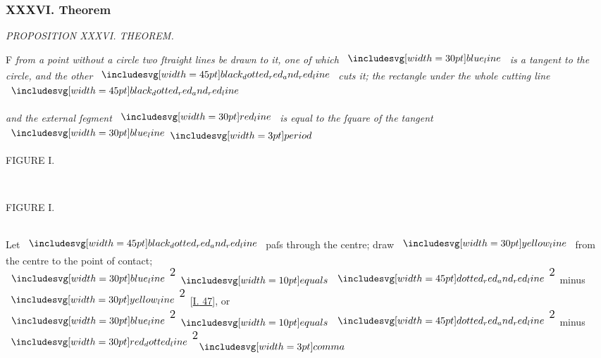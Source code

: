 \documentclass[11pt,preview]{standalone}
\begin{document}
\subsubsection{XXXVI. Theorem}

\hfill

\begin{minipage}[t]{\textwidth}
    \begin{center}
        \textit{PROPOSITION XXXVI. THEOREM.}\label{book3pr36} \\
    \end{center}

    \hfill

    \begin{center}
        \raggedright \lettrine[lines=3, loversize=1, nindent=0pt]{}{}F \textit{from a point without a circle two ſtraight lines be drawn to it, one of which } $\blueline$ \textit{is a tangent to the circle, and the other} $\bimg{black_dotted_red_and_red_line}$ \textit{cuts it; the rectangle under the whole cutting line} $\bimg{black_dotted_red_and_red_line}$
    \end{center}
    \raggedright \textit{and the external ſegment} $\redline$ \textit{is equal to the ſquare of the tangent} $\blueline \bperiod$
\end{minipage}%

\hfill

\begin{minipage}[t]{0.43\textwidth}
    \vspace{0pt}
    \begin{center}
        FIGURE I.
    \end{center}
    \hfill\\
    
\end{minipage}%
\hfill
\begin{minipage}[t]{0.54\textwidth}
    \vspace{0pt}

    \begin{center}
        FIGURE I.\\
        \hfill\\
        \raggedright Let $\bimg{black_dotted_red_and_red_line}$ paſs through the centre; draw $\yellowline$ from the centre to the point of contact;
        $\blueline^{\text{\large 2}} \bequals \bimg{dotted_red_and_red_line}^{\text{\large 2}}$ minus $\yellowline^{\text{\large 2}}$ [\hyperref[book1pr47]{\textsc{I.} 47}], or $\blueline^{\text{\large 2}} \bequals \bimg{dotted_red_and_red_line}^{\text{\large 2}}$ minus $\dottedredline^{\text{\large 2}} \bcomma$
    \end{center}
\end{minipage}%
\end{document}
